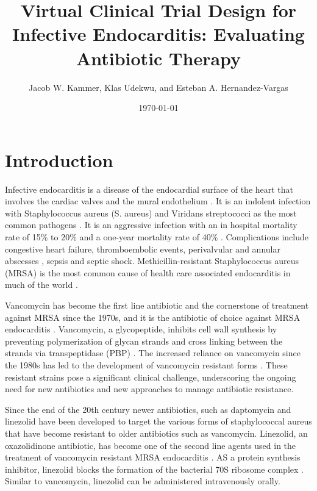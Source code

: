 \documentclass[12pt, draftcls, onecolumn]{IEEEtran}
\title{Virtual Clinical Trial Design for Infective Endocarditis: Evaluating Antibiotic Therapy}
\author{Jacob W. Kammer, Klas Udekwu, and Esteban A. Hernandez-Vargas}
\date{\today} %
\begin{document}
\maketitle
 


\section{Introduction}
Infective endocarditis is a disease of the endocardial surface of the heart that involves the cardiac valves and the mural endothelium \cite{Li2024}. It is an indolent infection with Staphylococcus aureus (S. aureus) and Viridans streptococci as the most common pathogens \cite{HammondHaley2023}. It is an aggressive infection with an in hospital mortality rate of 15\% to 20\% and a one-year mortality rate of 40\% \cite{Taduru2023}. Complications include congestive heart failure, thromboembolic events, perivalvular and annular abscesses \cite{murdoch2009infective}, sepsis and septic shock. Methicillin-resistant Staphylococcus aureus (MRSA) is the most common cause of health care associated endocarditis in much of the world \cite{HammondHaley2023}.    

Vancomycin has become the first line antibiotic and the cornerstone of treatment against MRSA since the 1970s, and it is the antibiotic of choice against MRSA endocarditis \cite{Minter2023}. Vancomycin, a glycopeptide, inhibits cell wall synthesis by preventing polymerization of glycan strands and cross linking between the strands via transpeptidase (PBP) \cite{murray_glycopeptides_2019}. The increased reliance on vancomycin since the 1980s has led to the development of vancomycin resistant forms \cite{mcguinness2017vancomycin}. These resistant strains pose a significant clinical challenge, underscoring the ongoing need for new antibiotics and new approaches to manage antibiotic resistance.  

Since the end of the 20th century newer antibiotics, such as daptomycin and linezolid have been developed to target the various forms of staphylococcal aureus that have become resistant to older antibiotics such as vancomycin.  Linezolid, an oxazolidinone antibiotic, has become one of the second line agents used in the treatment of vancomycin resistant MRSA endocarditis \cite{Cong2020}.  AS a protein synthesis inhibitor, linezolid blocks the formation of the bacterial 70S ribosome complex \cite{Shinabarger1997}. Similar to vancomycin, linezolid can be administered intravenously orally.  
\end{document}
